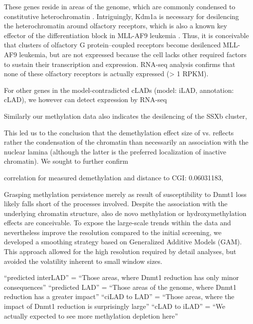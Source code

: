 These genes reside in areas of the genome, which are commonly condensed to constitutive heterochromatin \cite{Magklara2011,Clowney2012}. Intriguingly, Kdm1a is necessary for desilencing the heterochromatin around olfactory receptors\cite{Lyons2013}, which is also a known key effector of the differentiation block in MLL-AF9 leukemia \cite{Harris2012}. Thus, it is conceivable that clusters of olfactory G protein–coupled receptors become desilenced MLL-AF9 leukemia, but are not expressed because the cell lacks other required factors to sustain their transcription and expression. RNA-seq analysis confirms that none of these olfactory receptors is actually expressed (> 1 RPKM). 

For other genes in the model-contradicted cLADs (model: iLAD, annotation: cLAD), we
however can detect expression by RNA-seq

Similarly our methylation data also indicates the desilencing of the SSXb cluster, 

This led us to the conclusion that the demethylation effect size of \dnmtchip vs. \dnmtwt reflects rather the condensation of the chromatin than necessarily an association with the nuclear lamina (although the latter is the preferred localization of inactive chromatin\cite{Guelen2008}). We sought to further confirm 

correlation for measured demethylation and distance to CGI: 0.06031183, 


Grasping methylation persistence merely as result of susceptibility to Dnmt1 loss likely falls short of the processes involved. Despite the association with the underlying chromatin structure, also de novo methylation or hydroxymethylation effects are conceivable. To expose the large-scale trends within the data and nevertheless improve the resolution compared to the initial screening, we developed a smoothing strategy based on Generalized Additive Models (GAM). This approach allowed for the high resolution required by detail analyses, but avoided the volatility inherent to small window sizes. 

“predicted interLAD” = “Those areas, where Dnmt1 reduction has only minor consequences” 
“predicted LAD” = “Those areas of the genome, where Dnmt1 reduction has a greater impact”
“ciLAD to LAD” = “Those areas, where the impact of Dnmt1 reduction is surprisingly large”
“cLAD to iLAD” = “We actually expected to see more methylation depletion here”

